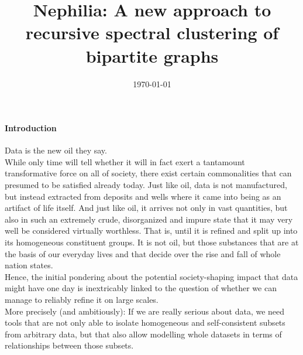 \documentclass[10pt, a4paper, twocolumn]{article} %
\title{Nephilia: A new approach to recursive spectral clustering of bipartite graphs} %
\author{
\authorstyle{Florian Schaefer}
}
\date{\today} %
\begin{document}
    \maketitle %

    \thispagestyle{firstpage} %




    \paragraph{Introduction}
    Data is the new oil they say.
    \\
    While only time will tell whether it will in fact exert a tantamount transformative force on all of society, there exist
    certain commonalities that can presumed to be satisfied already today.
    Just like oil, data is not manufactured, but instead extracted from deposits and wells where it came into being as an
    artifact of life itself.
    And just like oil, it arrives not only in vast quantities, but also in such an extremely crude, disorganized and impure
    state that it may very well be considered virtually worthless.
    That is, until it is refined and split up into its homogeneous constituent groups.
    It is not oil, but those substances that are at the basis of our everyday lives and that decide over the rise and fall
    of whole nation states.
    \\
    Hence, the initial pondering about the potential society-shaping impact that data might have one day is inextricably
    linked to the question of whether we can manage to reliably refine it on large scales.
    \\
    More precisely (and ambitiously): If we are really serious about data, we need tools that are not only able to isolate
    homogeneous and self-consistent subsets from arbitrary data, but that also allow modelling whole datasets in terms of
    relationships between those subsets.
\end{document}
